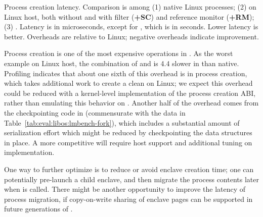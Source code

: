 \label{sec:eval:libos:fork}

\begin{table}[t!b!]

\caption{Process creation latency. Comparison is among (1) native Linux processes; (2) \graphene{} on Linux host, both without and with \seccomp{} filter ({\bf +SC}) and reference monitor ({\bf +RM}); (3) \graphenesgx{}.
Latency is in microseconds, except for \graphenesgx{}, which is in seconds. Lower latency is better.
Overheads are relative to Linux; negative overheads indicate improvement.} 
\label{tab:eval:libos:lmbench-fork}
\end{table}


Process creation is one of the most expensive operations
in \graphene{}.
As the worst example on Linux host,
the combination of  and  is 4.4\x{} slower in \graphene{} than native.
Profiling indicates that about one sixth of this overhead is in process creation, which 
takes additional work to create a clean \picoproc{} on Linux; we expect this overhead could be reduced
with a kernel-level implementation of the process creation ABI, rather than emulating this behavior on .
Another half of the overhead comes from the
checkpointing code in \thelibos{} (commensurate with the data in Table~\ref{tab:eval:libos:lmbench-fork}), which 
includes a substantial amount of serialization effort which might be reduced by checkpointing the data structures in place.
A more competitive  will require host support and additional tuning on \thelibos{} implementation.


One way to further optimize  is to reduce or avoid enclave creation time; one can potentially pre-launch a child enclave, and then migrate the process contents later when  is called.
There might be another opportunity to improve the latency of process migration,
if copy-on-write sharing of enclave pages can be supported in future generations of \sgx{}.

